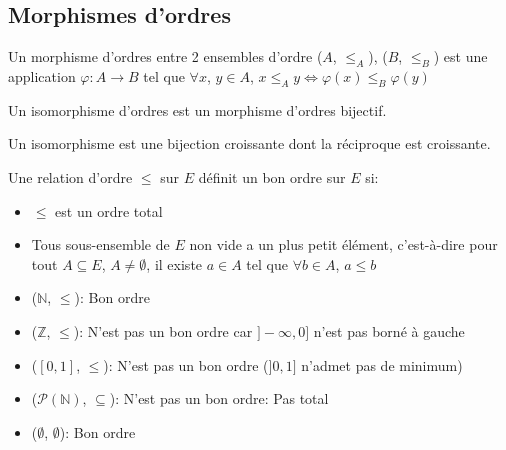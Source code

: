 \subsection{Morphismes d'ordres}

\begin{definition}

	Un morphisme d'ordres entre 2 ensembles d'ordre ($A$, $\leqslant_A$), ($B$, $\leqslant_B$) est une application $\varphi : A \to B$
	tel que $\forall x$, $y\in A$, $x \leqslant_A y \iff \varphi(x) \leqslant_B \varphi(y)$

\end{definition}

\begin{definition}
	Un isomorphisme d'ordres est un morphisme d'ordres bijectif.
\end{definition}

\begin{remarque}
	Un isomorphisme est une bijection croissante dont la réciproque est croissante.
\end{remarque}

\begin{definition}
	Une relation d'ordre $\leqslant$ sur $E$ définit un bon ordre sur $E$ si:
	\begin{itemize}
		\item $\leqslant$ est un ordre total
		\item Tous sous-ensemble de $E$ non vide a un plus petit élément, c'est-à-dire pour tout $A \subseteq E$, $A \neq \emptyset$, il existe
		      $a \in A$ tel que $\forall b \in A$, $a \leqslant b$
	\end{itemize}
\end{definition}

\begin{example}
	\begin{itemize}
		\item ($\mathbb{N}$, $\leqslant$): Bon ordre
		\item ($\mathbb{Z}$, $\leqslant$): N'est pas un bon ordre car $]-\infty, 0]$ n'est pas borné à gauche
		\item ($[0, 1]$, $\leqslant$): N'est pas un bon ordre ($]0, 1]$ n'admet pas de minimum)
		\item ($\mathscr{P}(\mathbb{N})$, $\subseteq$): N'est pas un bon ordre: Pas total
		\item ($\emptyset$, $\emptyset$): Bon ordre
	\end{itemize}
\end{example}

